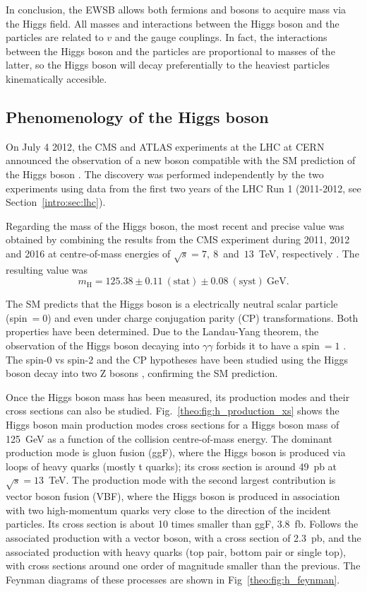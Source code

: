 \documentclass[../main.tex]{subfiles}
\begin{document}
In conclusion, the EWSB allows both fermions and bosons to acquire mass via the Higgs field. All masses and interactions between the Higgs boson and the particles are related to $v$ and the gauge couplings. In fact, the interactions between the Higgs boson and the particles are proportional to masses of the latter, so the Higgs boson will decay preferentially to the heaviest particles kinematically accesible.

\subsection{Phenomenology of the Higgs boson}

On July 4 2012, the CMS and ATLAS experiments at the LHC at CERN announced the observation of a new boson compatible with the SM prediction of the Higgs boson \cite{intro:theo:cms_higgs, intro:theo:atlas_higgs}. The discovery was performed independently by the two experiments using data from the first two years of the LHC Run 1 (2011-2012, see Section~\ref{intro:sec:lhc}).

Regarding the mass of the Higgs boson, the most recent and precise value was obtained by combining the results from the CMS experiment during 2011, 2012 and 2016 at centre-of-mass energies of $\sqrt{s}=7,~8$~and~$13$~TeV, respectively \cite{intro:theo:cms_higgs_mass}. The resulting value was
\begin{equation}
m_\text{H} = 125.38 \pm 0.11 ~(\text{stat}) \pm 0.08 ~(\text{syst}) ~\text{GeV}.
\end{equation}

The SM predicts that the Higgs boson is a electrically neutral scalar particle (spin$~=0$) and even under charge conjugation parity (CP) transformations. Both properties have been determined. Due to the Landau-Yang theorem, the observation of the Higgs boson decaying into $\gamma\gamma$ forbids it to have a spin$~=1$ \cite{intro:theory:landau, intro:theory:yang}. The spin-0 vs spin-2 and the CP hypotheses have been studied using the Higgs boson decay into two Z bosons \cite{intro:theory:cmshzz}, confirming the SM prediction.

Once the Higgs boson mass has been measured, its production modes and their cross sections can also be studied. Fig.~\ref{theo:fig:h_production_xs} shows the Higgs boson main production modes cross sections for a Higgs boson mass of 125~GeV as a function of the collision centre-of-mass energy. The dominant production mode is gluon fusion (ggF), where the Higgs boson is produced via loops of heavy quarks (mostly t quarks); its cross section is around 49~pb at $\sqrt{s}=13$~TeV. The production mode with the second largest contribution is vector boson fusion (VBF), where the Higgs boson is produced in association with two high-momentum quarks very close to the direction of the incident particles. Its cross section is about 10 times smaller than ggF, 3.8~fb. Follows the associated production with a vector boson, with a cross section of 2.3~pb, and the associated production with heavy quarks (top pair, bottom pair or single top), with cross sections around one order of magnitude smaller than the previous. The Feynman diagrams of these processes are shown in Fig~\ref{theo:fig:h_feynman}.
\end{document}
